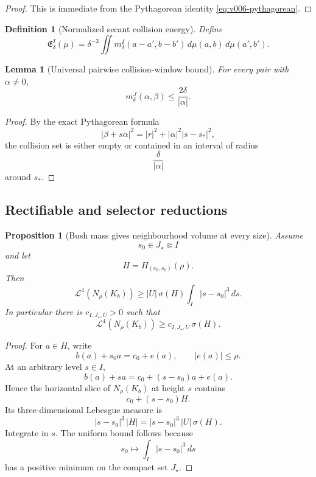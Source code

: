 \documentclass[10pt]{article}
\newtheorem{proposition}[theorem]{Proposition}
\newtheorem{lemma}[theorem]{Lemma}
\newtheorem{definition}[theorem]{Definition}
\begin{document}
\begin{proof}
This is immediate from the Pythagorean identity
\eqref{eq:v006-pythagorean}.
\end{proof}

\begin{definition}[Normalized secant collision energy]
\label{def:v006-energy}
Define
\begin{equation}
\label{eq:v006-energy}
\boxed{
\mathfrak E_\delta^I(\mu)
=
\delta^{-3}
\iint
m_\delta^I(a-a',b-b')\,
d\mu(a,b)\,d\mu(a',b').
}
\end{equation}
\end{definition}

\begin{lemma}[Universal pairwise collision-window bound]
\label{lem:v007-window-upper}
For every pair with \(\alpha\ne0\),
\begin{equation}
\label{eq:v007-window-upper}
\boxed{
m_\delta^J(\alpha,\beta)
\le
\frac{2\delta}{|\alpha|}.
}
\end{equation}
\end{lemma}

\begin{proof}
By the exact Pythagorean formula
\[
|\beta+s\alpha|^2
=
|r|^2+|\alpha|^2|s-s_*|^2,
\]
the collision set is either empty or contained in an interval of radius
\[
\frac{\delta}{|\alpha|}
\]
around \(s_*\).
\end{proof}

\subsection{Rectifiable and selector reductions}

\begin{proposition}[Bush mass gives neighbourhood volume at every size]
\label{prop:v010-bush-volume}
Assume
\[
s_0\in J_\star
\Subset I
\]
and let
\[
H=H_{(c_0,s_0)}(\rho).
\]
Then
\begin{equation}
\label{eq:v010-bush-volume}
\boxed{
\mathcal L^4
\left(
N_\rho(K_b)
\right)
\ge
|U|\,\sigma(H)
\int_I|s-s_0|^3\,ds.
}
\end{equation}
In particular there is \(c_{I,J_\star,U}>0\) such that
\begin{equation}
\label{eq:v010-bush-volume-uniform}
\boxed{
\mathcal L^4(N_\rho(K_b))
\ge
c_{I,J_\star,U}\,
\sigma(H).
}
\end{equation}
\end{proposition}

\begin{proof}
For \(a\in H\), write
\[
b(a)+s_0a=c_0+e(a),
\qquad
|e(a)|\le\rho.
\]
At an arbitrary level \(s\in I\),
\[
b(a)+sa
=
c_0+(s-s_0)a+e(a).
\]
Hence the horizontal slice of \(N_\rho(K_b)\) at height \(s\) contains
\[
c_0+(s-s_0)H.
\]
Its three-dimensional Lebesgue measure is
\[
|s-s_0|^3\,|H|
=
|s-s_0|^3\,|U|\,\sigma(H).
\]
Integrate in \(s\).  The uniform bound follows because
\[
s_0\mapsto\int_I|s-s_0|^3\,ds
\]
has a positive minimum on the compact set \(J_\star\).
\end{proof}
\end{document}
